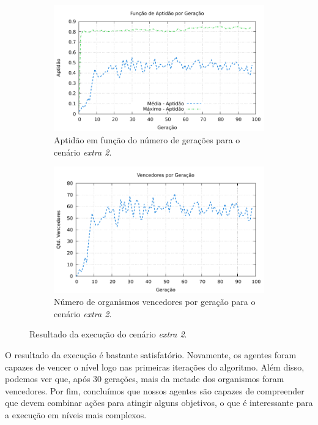 \begin{figure}[H]
\centering
	\begin{subfigure}[b]{0.45\textwidth}
        \includegraphics[width=\textwidth]{fig/extra2-fitness.pdf}
        \caption{Aptidão em função do número de gerações para o cenário
        \textit{extra 2}.}
	\end{subfigure}
	\begin{subfigure}[b]{0.45\textwidth}
        \includegraphics[width=\textwidth]{fig/extra2-winners.pdf}
        \caption{Número de organismos vencedores por geração para o cenário
        \textit{extra 2}.}
	\end{subfigure}

    \caption{Resultado da execução do cenário \textit{extra 2}.}
	\label{fig:extra2-results}
\end{figure}

O resultado da execução é bastante satisfatório. Novamente, os agentes foram
capazes de vencer o nível logo nas primeiras iterações do algoritmo. Além disso,
podemos ver que, após 30 gerações, mais da metade dos organismos foram
vencedores. Por fim, concluímos que nossos agentes são capazes de compreender
que devem combinar ações para atingir alguns objetivos, o que é interessante
para a execução em níveis mais complexos.  

